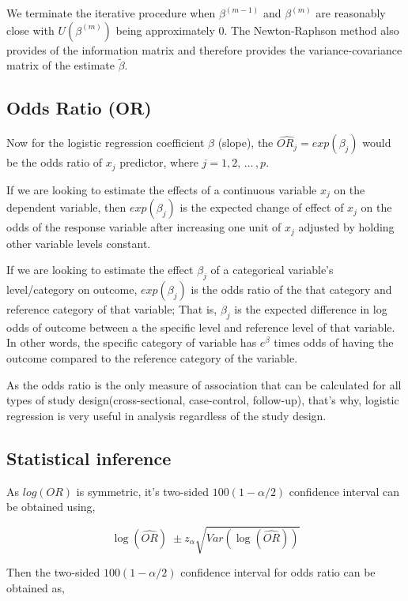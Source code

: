 \documentclass[
  12pt,
  oneside]{report}
\begin{document}
We terminate the iterative procedure when \(\beta^{(m-1)}\) and \(\beta^{(m)}\) are reasonably close with \(U(\beta^{(m)})\) being approximately 0. The Newton-Raphson method also provides of the information matrix and therefore provides the variance-covariance matrix of the estimate \(\tilde{\beta}\).

\hypertarget{odds-ratio-or}{%
\subsection{Odds Ratio (OR)}\label{odds-ratio-or}}

Now for the logistic regression coefficient \(\beta\) (slope), the \(\widehat{OR_j} = exp(\beta_j)\) would be the odds ratio of \(x_j\) predictor, where \(j = 1, 2, \, \dots \, , p\).

If we are looking to estimate the effects of a continuous variable \(x_j\) on the dependent variable, then \(exp(\beta_j)\) is the expected change of effect of \(x_j\) on the odds of the response variable after increasing one unit of \(x_j\) adjusted by holding other variable levels constant.

If we are looking to estimate the effect \(\beta_j\) of a categorical variable's level/category on outcome, \(exp(\beta_j)\) is the odds ratio of the that category and reference category of that variable; That is, \(\beta_j\) is the expected difference in log odds of outcome between a the specific level and reference level of that variable. In other words, the specific category of variable has \(e^{\beta}\) times odds of having the outcome compared to the reference category of the variable.

As the odds ratio is the only measure of association that can be calculated for all
types of study design(cross-sectional, case-control, follow-up), that's why, logistic
regression is very useful in analysis regardless of the study design.

\hypertarget{statistical-inference}{%
\subsection{Statistical inference}\label{statistical-inference}}

As \(log(OR)\) is symmetric, it's two-sided \(100(1 − \alpha/2)\) confidence interval can be obtained using,

\[
\log(\widehat{OR}) \; \pm z_\alpha \sqrt{Var(\log(\widehat{OR}))}
\]

Then the two-sided \(100(1 − \alpha/2)\) confidence interval for odds ratio can be obtained as,
\end{document}
